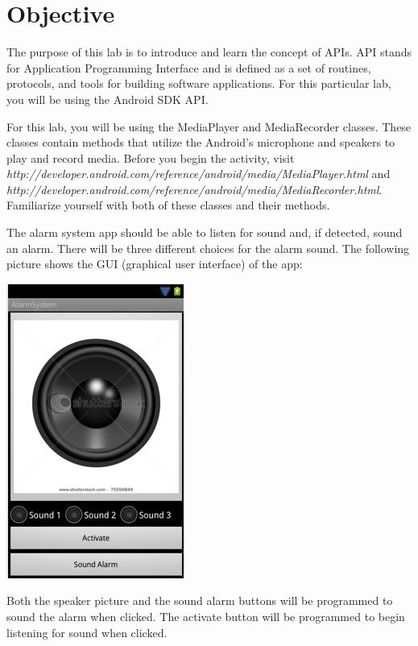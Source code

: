 \section{Objective}

The purpose of this lab is to introduce and learn the concept of APIs. API stands for Application Programming Interface and is defined as a set of routines, protocols, and tools for building software applications. For this particular lab, you will be using the Android SDK API.

\vspace{5 mm}
\noindent
For this lab, you will be using the MediaPlayer and MediaRecorder classes. These classes contain methods that utilize the Android's microphone and speakers to play and record media. Before you begin the activity, visit \textit{http://developer.android.com/reference/android/media/MediaPlayer.html} and \textit{http://developer.android.com/reference/android/media/MediaRecorder.html}. Familiarize yourself with both of these classes and their methods.

\vspace{5 mm}
\noindent
The alarm system app should be able to listen for sound and, if detected, sound an alarm. There will be three different choices for the alarm sound. The following picture shows the GUI (graphical user interface) of the app:

\begin{center}

\includegraphics[scale=0.4]{screenshot.png} 

\end{center}

\noindent
Both the speaker picture and the sound alarm buttons will be programmed to sound the alarm when clicked. The activate button will be programmed to begin listening for sound when clicked.
